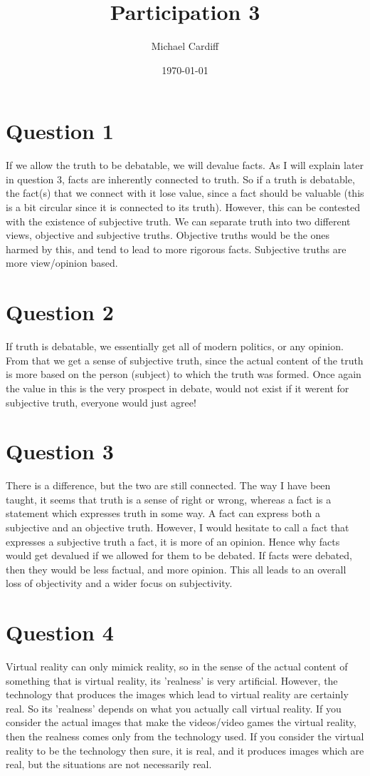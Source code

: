\documentclass[12pt]{article}
\title{Participation 3}
\author{Michael Cardiff}
\date{\today}
\begin{document}
\maketitle
\section*{Question 1}
If we allow the truth to be debatable, we will devalue facts. As I will explain later in question 3, facts are inherently connected to truth. So if a truth is debatable, the fact(s) that we connect with it lose value, since a fact should be valuable (this is a bit circular since it is connected to its truth). However, this can be contested with the existence of subjective truth. We can separate truth into two different views, objective and subjective truths. Objective truths would be the ones harmed by this, and tend to lead to more rigorous facts. Subjective truths are more view/opinion based. 
\section*{Question 2}
If truth is debatable, we essentially get all of modern politics, or any opinion. From that we get a sense of subjective truth, since the actual content of the truth is more based on the person (subject) to which the truth was formed. Once again the value in this is the very prospect in debate, would not exist if it werent for subjective truth, everyone would just agree! 
\section*{Question 3}
There is a difference, but the two are still connected. The way I have been taught, it seems that truth is a sense of right or wrong, whereas a fact is a statement which expresses truth in some way. A fact can express both a subjective and an objective truth. However, I would hesitate to call a fact that expresses a subjective truth a fact, it is more of an opinion. Hence why facts would get devalued if we allowed for them to be debated. If facts were debated, then they would be less factual, and more opinion. This all leads to an overall loss of objectivity and a wider focus on subjectivity. 
\section*{Question 4}
Virtual reality can only mimick reality, so in the sense of the actual content of something that is virtual reality, its 'realness' is very artificial. However, the technology that produces the images which lead to virtual reality are certainly real. So its 'realness' depends on what you actually call virtual reality. If you consider the actual images that make the videos/video games the virtual reality, then the realness comes only from the technology used. If you consider the virtual reality to be the technology then sure, it is real, and it produces images which are real, but the situations are not necessarily real. 
\end{document}
